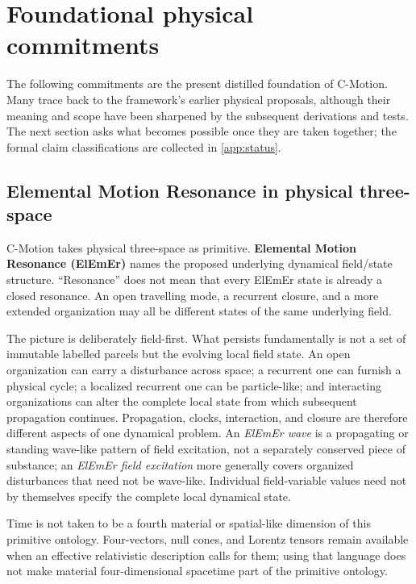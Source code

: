 \documentclass[11pt]{article}
\theoremstyle{definition}
\newcommand{\cmotion}{\mbox{C-Motion}}
\newcommand{\ElEmEr}{\mbox{ElEmEr}}
\begin{document}
\section{Foundational physical commitments}
\label{sec:premises}

The following commitments are the present distilled foundation of \cmotion{}.  Many trace
back to the framework's earlier physical proposals, although their meaning and scope have
been sharpened by the subsequent derivations and tests.  The next section asks what
becomes possible once they are taken together; the formal claim classifications are
collected in \cref{app:status}.

\subsection{Elemental Motion Resonance in physical three-space}
\label{subsec:three_space}

\cmotion{} takes physical three-space as primitive.  \textbf{Elemental Motion Resonance
(ElEmEr)} names the proposed underlying dynamical field/state structure.  ``Resonance''
does not mean that every \ElEmEr{} state is already a closed resonance.  An open travelling
mode, a recurrent closure, and a more extended organization may all be different states
of the same underlying field.

The picture is deliberately field-first.  What persists fundamentally is not a set of
immutable labelled parcels but the evolving local field state.  An open organization can
carry a disturbance across space; a recurrent one can furnish a physical cycle; a
localized recurrent one can be particle-like; and interacting organizations can alter
the complete local state from which subsequent propagation continues.  Propagation,
clocks, interaction, and closure are therefore different aspects of one dynamical
problem.  An \emph{ElEmEr wave} is a propagating or standing wave-like pattern of field
excitation, not a separately conserved piece of substance; an \emph{ElEmEr field excitation} more generally covers organized disturbances that need not be wave-like.  Individual field-variable values need not by
themselves specify the complete local dynamical state.

Time is not taken to be a fourth material or spatial-like dimension of this primitive
ontology.  Four-vectors, null cones, and Lorentz tensors remain available when an
effective relativistic description calls for them; using that language does not make
material four-dimensional spacetime part of the primitive ontology.
\end{document}
